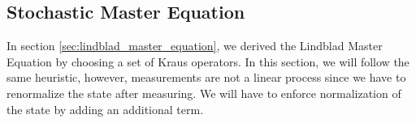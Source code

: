 
\subsection{Stochastic Master Equation}
In section \ref{sec:lindblad_master_equation}, we derived the Lindblad Master Equation by choosing a set of Kraus operators. In this section, we will follow the same heuristic, however, measurements are not a linear process since we have to renormalize the state after measuring. We will have to enforce normalization of the state by adding an additional term.

